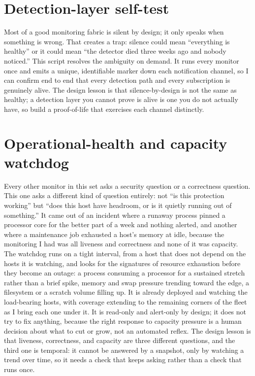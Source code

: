 \documentclass[12pt]{article}
\begin{document}
\section{Detection-layer self-test}

Most of a good monitoring fabric is silent by design; it only speaks when something is wrong. That creates a trap: silence could mean ``everything is healthy'' or it could mean ``the detector died three weeks ago and nobody noticed.'' This script resolves the ambiguity on demand. It runs every monitor once and emits a unique, identifiable marker down each notification channel, so I can confirm end to end that every detection path and every subscription is genuinely alive. The design lesson is that silence-by-design is not the same as healthy; a detection layer you cannot prove is alive is one you do not actually have, so build a proof-of-life that exercises each channel distinctly.

\section{Operational-health and capacity watchdog}

Every other monitor in this set asks a security question or a correctness question. This one asks a different kind of question entirely: not ``is this protection working'' but ``does this host have headroom, or is it quietly running out of something.'' It came out of an incident where a runaway process pinned a processor core for the better part of a week and nothing alerted, and another where a maintenance job exhausted a host's memory at idle, because the monitoring I had was all liveness and correctness and none of it was capacity. The watchdog runs on a tight interval, from a host that does not depend on the hosts it is watching, and looks for the signatures of resource exhaustion before they become an outage: a process consuming a processor for a sustained stretch rather than a brief spike, memory and swap pressure trending toward the edge, a filesystem or a scratch volume filling up. It is already deployed and watching the load-bearing hosts, with coverage extending to the remaining corners of the fleet as I bring each one under it. It is read-only and alert-only by design; it does not try to fix anything, because the right response to capacity pressure is a human decision about what to cut or grow, not an automated reflex. The design lesson is that liveness, correctness, and capacity are three different questions, and the third one is temporal: it cannot be answered by a snapshot, only by watching a trend over time, so it needs a check that keeps asking rather than a check that runs once.
\end{document}

